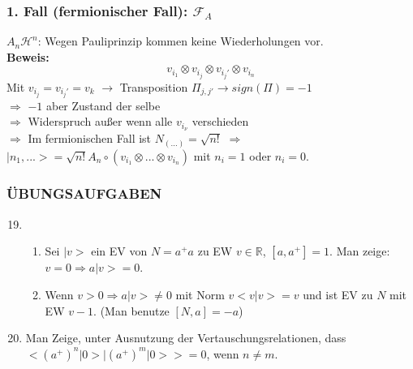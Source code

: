 \documentclass[twoside,a4paper]{scrartcl}
\newcommand{\R}{\mathbb{R}}
\renewcommand{\1}{\mathds{1}}
\newcommand{\Ra}{\Rightarrow}
\newcommand{\ra}{\rightarrow}
\renewcommand{\H}{\mathcal{H}}
\newcommand{\F}{\mathcal{F}}
\renewcommand{\R}{\mathbb{R}}
\begin{document}
\subsubsection*{1. Fall (fermionischer Fall): $\F_A$}
$A_n \H^n$: Wegen Pauliprinzip kommen keine Wiederholungen vor.\\
\textbf{Beweis:}\\
$$v_{i_1}\otimes v_{i_j}\otimes v_{i_j'}\otimes v_{i_n}$$
Mit $v_{i_j}=v_{i_j'}=v_k$ $\ra$ Transposition $\Pi_{j,j'} \ra sign(\Pi)=-1$\\
$\Ra$ $-1$ aber Zustand der selbe\\
$\Ra$ Widerspruch außer wenn alle $v_{i_\nu}$ verschieden\\
$\Ra$ Im fermionischen Fall ist $N_{(...)}=\sqrt{n!}$ $\Ra$ $|n_1,...>=\sqrt{n!}A_n \circ ({v_{i_1}\otimes ... \otimes v_{i_n}})$ mit $n_i=1$ oder $n_i=0$.
\subsubsection*{ÜBUNGSAUFGABEN}
\begin{enumerate}
\setcounter{enumi}{18}
\item \begin{enumerate}
\item Sei $|v>$ ein EV von $N=a^+a$ zu EW $v\in \R$, $[a,a^+]=1$. Man zeige: $v=0 \Ra a|v>=0$.
\item Wenn $v>0 \Ra a|v>\neq 0$ mit Norm $v<v|v>=v$ und ist EV zu $N$ mit EW $v-1$. (Man benutze $[N,a]=-a$)
\end{enumerate}
\item Man Zeige, unter Ausnutzung der Vertauschungsrelationen, dass $<(a^+)^n|0>|(a^+)^m|0>>=0$, wenn $n\neq m$.
\end{enumerate}
\end{document}
